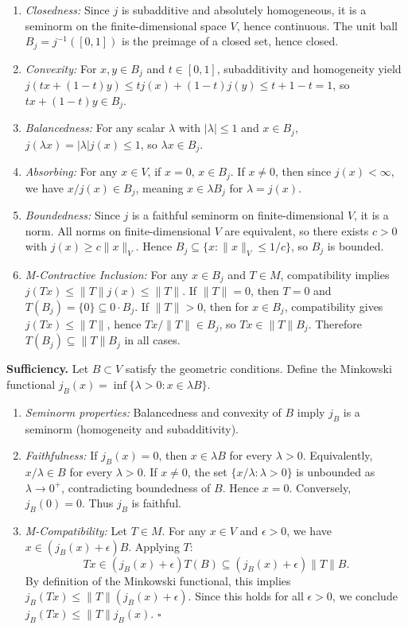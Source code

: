 \documentclass[
  11pt,
]{article}
\providecommand{\tightlist}{%
  \setlength{\itemsep}{0pt}\setlength{\parskip}{0pt}}
\providecommand{\tightlist}{%
  \setlength{\itemsep}{0pt}\setlength{\parskip}{0pt}}
\begin{document}
\begin{enumerate}
\def\labelenumi{\arabic{enumi}.}
\tightlist
\item
  \emph{Closedness:} Since \(j\) is subadditive and absolutely homogeneous, it is a seminorm on the finite-dimensional space \(V\), hence continuous. The unit ball \(B_j = j^{-1}([0, 1])\) is the preimage of a closed set, hence closed.
\item
  \emph{Convexity:} For \(x, y \in B_j\) and \(t \in [0, 1]\), subadditivity and homogeneity yield \(j(tx + (1-t)y) \leq t j(x) + (1-t)j(y) \leq t + 1 - t = 1\), so \(tx + (1-t)y \in B_j\).
\item
  \emph{Balancedness:} For any scalar \(\lambda\) with \(|\lambda| \leq 1\) and \(x \in B_j\), \(j(\lambda x) = |\lambda| j(x) \leq 1\), so \(\lambda x \in B_j\).
\item
  \emph{Absorbing:} For any \(x \in V\), if \(x = 0\), \(x \in B_j\). If \(x \neq 0\), then since \(j(x) < \infty\), we have \(x / j(x) \in B_j\), meaning \(x \in \lambda B_j\) for \(\lambda = j(x)\).
\item
  \emph{Boundedness:} Since \(j\) is a faithful seminorm on finite-dimensional \(V\), it is a norm. All norms on finite-dimensional \(V\) are equivalent, so there exists \(c>0\) with \(j(x)\ge c\|x\|_V\). Hence \(B_j\subseteq \{x:\|x\|_V\le 1/c\}\), so \(B_j\) is bounded.
\item
  \emph{M-Contractive Inclusion:} For any \(x \in B_j\) and \(T \in M\), compatibility implies \(j(T x) \leq \|T\| j(x) \leq \|T\|\). If \(\|T\|=0\), then \(T=0\) and \(T(B_j)=\{0\}\subseteq 0\cdot B_j\). If \(\|T\|>0\), then for \(x\in B_j\), compatibility gives \(j(Tx)\le \|T\|\), hence \(Tx/\|T\|\in B_j\), so \(Tx\in \|T\|B_j\). Therefore \(T(B_j)\subseteq \|T\|B_j\) in all cases.
\end{enumerate}

\textbf{Sufficiency.} Let \(B \subset V\) satisfy the geometric conditions. Define the Minkowski functional \(j_B(x) = \inf\{\lambda > 0 : x \in \lambda B\}\).

\begin{enumerate}
\def\labelenumi{\arabic{enumi}.}
\tightlist
\item
  \emph{Seminorm properties:} Balancedness and convexity of \(B\) imply \(j_B\) is a seminorm (homogeneity and subadditivity).
\item
  \emph{Faithfulness:} If \(j_B(x)=0\), then \(x\in \lambda B\) for every \(\lambda>0\). Equivalently, \(x/\lambda\in B\) for every \(\lambda>0\). If \(x\neq0\), the set \(\{x/\lambda:\lambda>0\}\) is unbounded as \(\lambda\to0^+\), contradicting boundedness of \(B\). Hence \(x=0\). Conversely, \(j_B(0)=0\). Thus \(j_B\) is faithful.
\item
  \emph{M-Compatibility:} Let \(T \in M\). For any \(x \in V\) and \(\epsilon > 0\), we have \(x \in (j_B(x) + \epsilon) B\). Applying \(T\):
  \[T x \in (j_B(x) + \epsilon) T(B) \subseteq (j_B(x) + \epsilon) \|T\| B.\]
  By definition of the Minkowski functional, this implies \(j_B(T x) \leq \|T\| (j_B(x) + \epsilon)\). Since this holds for all \(\epsilon > 0\), we conclude \(j_B(T x) \leq \|T\| j_B(x).\) \(\square\)
\end{enumerate}
\end{document}
